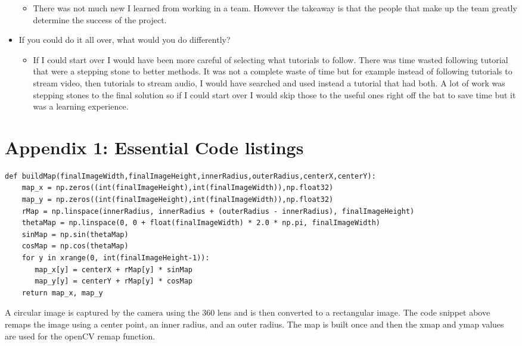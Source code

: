 \documentclass[onecolumn, draftclsnofoot,10pt, compsoc]{IEEEtran}
\begin{document}
\begin{itemize}
        \begin{itemize}
            \item  There was not much new I learned from working in a team. However the takeaway is that the people that make up the team greatly determine the success of the project. 
        \end{itemize}
        \item If you could do it all over, what would you do differently?
        \begin{itemize}
            \item If I could start over I would have been more careful of selecting what tutorials to follow. There was time wasted following tutorial that were a stepping stone to better methods. It was not a complete waste of time but for example instead of following tutorials to stream video, then tutorials to stream audio, I  would have searched and used instead a tutorial that had both. A lot of work was stepping stones to the final solution so if I could start over I would skip those to the useful ones right off the bat to save time but it was a learning experience. 

        \end{itemize}
    \end{itemize}

\section{Appendix 1: Essential Code listings}

\begin{lstlisting}
def buildMap(finalImageWidth,finalImageHeight,innerRadius,outerRadius,centerX,centerY):
    map_x = np.zeros((int(finalImageHeight),int(finalImageWidth)),np.float32)
    map_y = np.zeros((int(finalImageHeight),int(finalImageWidth)),np.float32)
    rMap = np.linspace(innerRadius, innerRadius + (outerRadius - innerRadius), finalImageHeight)
    thetaMap = np.linspace(0, 0 + float(finalImageWidth) * 2.0 * np.pi, finalImageWidth)
    sinMap = np.sin(thetaMap)
    cosMap = np.cos(thetaMap)
    for y in xrange(0, int(finalImageHeight-1)):
       map_x[y] = centerX + rMap[y] * sinMap
       map_y[y] = centerY + rMap[y] * cosMap
    return map_x, map_y
\end{lstlisting}

A circular image is captured by the camera using the 360 lens and is then converted to a rectangular image. The code snippet above remaps the image using a center point, an inner radius, and an outer radius. The map is built once and then the xmap and ymap values are used for the openCV remap function.
\end{document}
